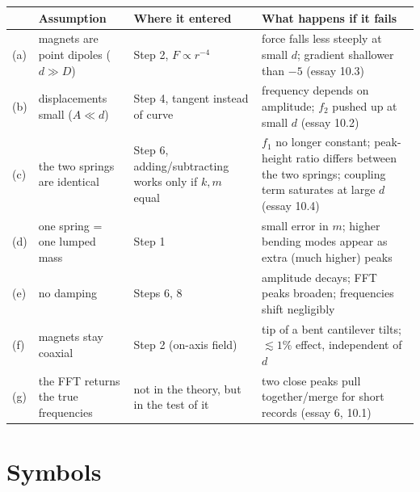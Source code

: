 \documentclass[11pt,a4paper]{article}
\begin{document}
\begin{center}\small
\begin{tabular}{@{}p{0.5cm}p{4.6cm}p{5.3cm}p{5.0cm}@{}}
\toprule
 & Assumption & Where it entered & What happens if it fails\\
\midrule
(a) & magnets are point dipoles ($d\gg D$) & Step 2, $F\propto r^{-4}$ & force falls less steeply at small $d$; gradient shallower than $-5$ (essay 10.3)\\
(b) & displacements small ($A\ll d$) & Step 4, tangent instead of curve & frequency depends on amplitude; $f_2$ pushed up at small $d$ (essay 10.2)\\
(c) & the two springs are identical & Step 6, adding/subtracting works only if $k,m$ equal & $f_1$ no longer constant; peak-height ratio differs between the two springs; coupling term saturates at large $d$ (essay 10.4)\\
(d) & one spring = one lumped mass & Step 1 & small error in $m$; higher bending modes appear as extra (much higher) peaks\\
(e) & no damping & Steps 6, 8 & amplitude decays; FFT peaks broaden; frequencies shift negligibly\\
(f) & magnets stay coaxial & Step 2 (on-axis field) & tip of a bent cantilever tilts; $\lesssim1\%$ effect, independent of $d$\\
(g) & the FFT returns the true frequencies & not in the theory, but in the test of it & two close peaks pull together/merge for short records (essay 6, 10.1)\\
\bottomrule
\end{tabular}
\end{center}

\section{Symbols}
\end{document}
